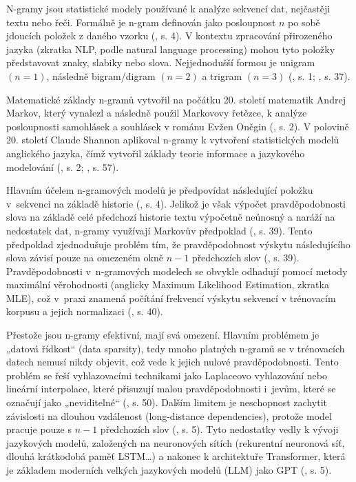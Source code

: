 \documentclass[a4paper, twoside, 12pt, czech]{article}
\begin{document}
N-gramy jsou statistické modely používané k analýze sekvencí dat, nejčastěji 
textu nebo řeči. Formálně je n-gram definován jako posloupnost $n$ po sobě jdou\-cích
položek z daného vzorku (\cite{evolutionFromNgrams}, s. 4). V kontextu zpracování 
přirozeného jazyka (zkratka NLP, podle natural language processing) mohou tyto položky představovat
znaky, slabiky nebo slova. Nejjednodušší formou je unigram $(n = 1)$, následně 
bigram/digram $(n = 2)$ a trigram $(n = 3)$ (\cite{ngramStatistics1979}, s. 1; \cite{jm3}, s. 37).

Matematické základy n-gramů vytvořil na počátku 20. století matematik Andrej Markov,
který vynalezl a následně použil Markovovy řetězce, k analýze posloupnosti samohlásek
a souhlásek v románu Evžen Oněgin (\cite{evolutionFromNgrams}, s. 2). V polovině 
20. století Claude Shannon aplikoval n-gramy k vytvoření statistických modelů
anglického jazyka, čímž vytvořil základy teorie informace a jazykového modelování
(\cite{evolutionFromNgrams}, s. 2; \cite{jm3}, s. 57).

Hlavním účelem n-gramových modelů je předpovídat následující položku v~sekvenci
na základě historie (\cite{evolutionFromNgrams}, s. 4). Jelikož je však výpočet pravděpodobnosti slova na základě 
celé předchozí historie textu výpočetně neúnosný a naráží na nedostatek dat, 
n-gramy využívají Markovův předpoklad (\cite{jm3}, s. 39). Tento předpo\-klad zjednodušuje
problém tím, že pravděpodobnost výskytu následujícího slova závisí pouze na 
omezeném okně $n - 1$ předchozích slov (\cite{jm3}, s. 39). Pravděpodobnosti 
v~n-gramových modelech se obvykle odhadují pomocí metody maximální věro\-hodnosti 
(anglicky Maximum Likelihood Estimation, zkratka MLE), což v~praxi znamená počítání frekvencí 
výskytu sekvencí v trénovacím korpusu a jejich normalizaci (\cite{jm3}, s. 40).

Přestože jsou n-gramy efektivní, mají svá omezení. Hlavním problémem je „datová 
řídkost“ (data sparsity), tedy mnoho platných n-gramů se v trénovacích datech 
nemusí nikdy objevit, což vede k jejich nulové pravděpodobnosti. Tento problém 
se řeší vyhlazovacími technikami jako Laplaceovo vyhlazování nebo lineární interpolace,
které přisuzují malou pravděpodobnosti i~jevům, které se označují jako „neviditelné“ (\cite{jm3}, s. 50).
Dalším limitem je neschopnost zachytit závislosti na dlouhou vzdálenost (long-distance
dependencies), protože model pracuje pouze s $n - 1$ předchozích slov (\cite{evolutionFromNgrams}, s. 5).
Tyto nedostatky vedly k vývoji jazykových modelů, založených na neuronových sítích
(rekurentní neuronová síť, dlouhá krátkodobá paměť LSTM\dots) a nakonec k architektuře
Transformer, která je základem moderních velkých jazykových modelů (LLM) jako 
GPT (\cite{evolutionFromNgrams}, s. 5).
\end{document}
